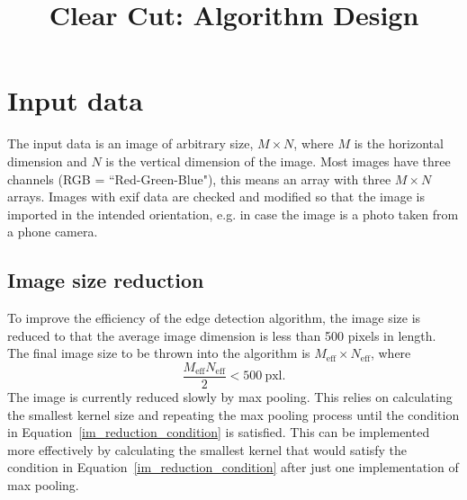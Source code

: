 \documentclass[11pt]{article}
\begin{document}
\thispagestyle{empty}

\title{Clear Cut: Algorithm Design}
\maketitle
\tableofcontents

\newpage




\section{Input data}
The input data is an image of arbitrary size, $M \times N$, where $M$ is the horizontal dimension and $N$ is the vertical dimension of the image. Most images have three channels (RGB = ``Red-Green-Blue"), this means an array with three $M \times N$ arrays. Images with exif data are checked and modified so that the image is imported in the intended orientation, e.g. in case the image is a photo taken from a phone camera.




\subsection{Image size reduction}
To improve the efficiency of the edge detection algorithm, the image size is reduced to that the average image dimension is less than 500 pixels in length. The final image size to be thrown into the algorithm is $M_{\text{eff}} \times N_{\text{eff}}$, where
\begin{equation}
\dfrac{M_{\text{eff}} N_{\text{eff}}}{2}<500~\text{pxl} \text{.}
\label{im_reduction_condition}
\end{equation}
The image is currently reduced slowly by max pooling. This relies on calculating the smallest kernel size and repeating the max pooling process until the condition in Equation~\ref{im_reduction_condition} is satisfied. This can be implemented more effectively by calculating the smallest kernel that would satisfy the condition in Equation~\ref{im_reduction_condition} after just one implementation of max pooling.
\end{document}
